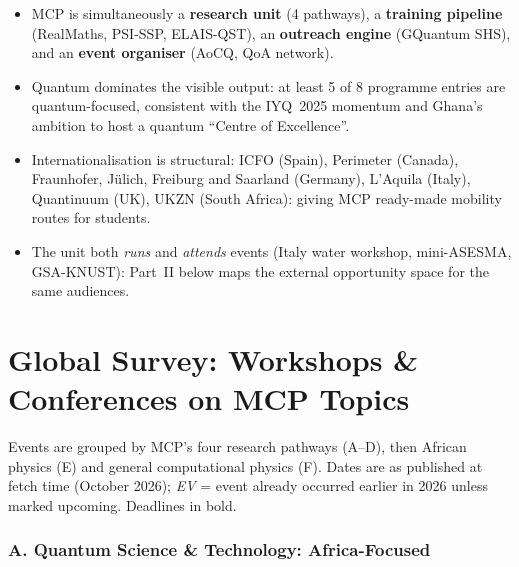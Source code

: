 \documentclass[11pt,a4paper]{article}
\newcommand{\ev}{\emph{EV}}
\begin{document}
\begin{itemize}[leftmargin=1.4em]
  \item MCP is simultaneously a \textbf{research unit} (4 pathways), a \textbf{training pipeline} (RealMaths, PSI-SSP, ELAIS-QST), an \textbf{outreach engine} (GQuantum SHS), and an \textbf{event organiser} (AoC\textbar Q, QoA network).
  \item Quantum dominates the visible output: at least 5 of 8 programme entries are quantum-focused, consistent with the IYQ~2025 momentum and Ghana's ambition to host a quantum ``Centre of Excellence''.
  \item Internationalisation is structural: ICFO (Spain), Perimeter (Canada), Fraunhofer, Jülich, Freiburg and Saarland (Germany), L'Aquila (Italy), Quantinuum (UK), UKZN (South Africa): giving MCP ready-made mobility routes for students.
  \item The unit both \emph{runs} and \emph{attends} events (Italy water workshop, mini-ASESMA, GSA-KNUST): Part~II below maps the external opportunity space for the same audiences.
\end{itemize}

\newpage
\part{Global Survey: Workshops \& Conferences on MCP Topics}
\label{part:survey}

Events are grouped by MCP's four research pathways (A--D), then African physics (E) and general computational physics (F). Dates are as published at fetch time (October 2026); \ev{} = event already occurred earlier in 2026 unless marked upcoming. Deadlines in bold.

\section{A. Quantum Science \& Technology: Africa-Focused}
\end{document}
